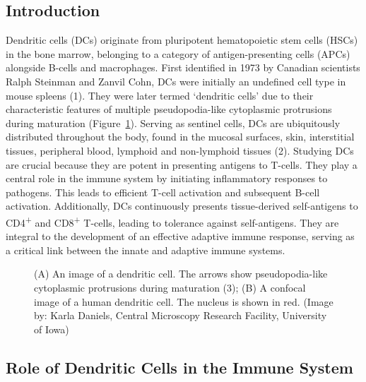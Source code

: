 \documentclass[
]{article}
\makeatletter
\newcommand*\pandocbounded[1]{%
  \sbox\pandoc@box{#1}%
  \Gscale@div\@tempa{\textheight}{\dimexpr\ht\pandoc@box+\dp\pandoc@box\relax}%
  \Gscale@div\@tempb{\linewidth}{\wd\pandoc@box}%
  \ifdim\@tempb\p@<\@tempa\p@\let\@tempa\@tempb\fi%
  \ifdim\@tempa\p@<\p@\scalebox{\@tempa}{\usebox\pandoc@box}%
  \else\usebox{\pandoc@box}%
  \fi%
}
\makeatother
\begin{document}
\subsection{Introduction}\label{introduction}

Dendritic cells (DCs) originate from pluripotent hematopoietic stem
cells (HSCs) in the bone marrow, belonging to a category of
antigen-presenting cells (APCs) alongside B-cells and macrophages. First
identified in 1973 by Canadian scientists Ralph Steinman and Zanvil
Cohn, DCs were initially an undefined cell type in mouse spleens (1).
They were later termed `dendritic cells' due to their characteristic
features of multiple pseudopodia-like cytoplasmic protrusions during
maturation (Figure~\ref{fig-dc}). Serving as sentinel cells, DCs are
ubiquitously distributed throughout the body, found in the mucosal
surfaces, skin, interstitial tissues, peripheral blood, lymphoid and
non-lymphoid tissues (2). Studying DCs are crucial because they are
potent in presenting antigens to T-cells. They play a central role in
the immune system by initiating inflammatory responses to pathogens.
This leads to efficient T-cell activation and subsequent B-cell
activation. Additionally, DCs continuously presents tissue-derived
self-antigens to CD4\textsuperscript{+} and CD8\textsuperscript{+}
T-cells, leading to tolerance against self-antigens. They are integral
to the development of an effective adaptive immune response, serving as
a critical link between the innate and adaptive immune systems.

\begin{figure}

\centering{

\pandocbounded{\texttt{[image: images/fig\_1.png]}}

}

\caption{\label{fig-dc}(A) An image of a dendritic cell. The arrows show
pseudopodia-like cytoplasmic protrusions during maturation (3); (B) A
confocal image of a human dendritic cell. The nucleus is shown in red.
(Image by: Karla Daniels, Central Microscopy Research Facility,
University of Iowa)}

\end{figure}%

\subsection{Role of Dendritic Cells in the Immune
System}\label{role-of-dendritic-cells-in-the-immune-system}
\end{document}
